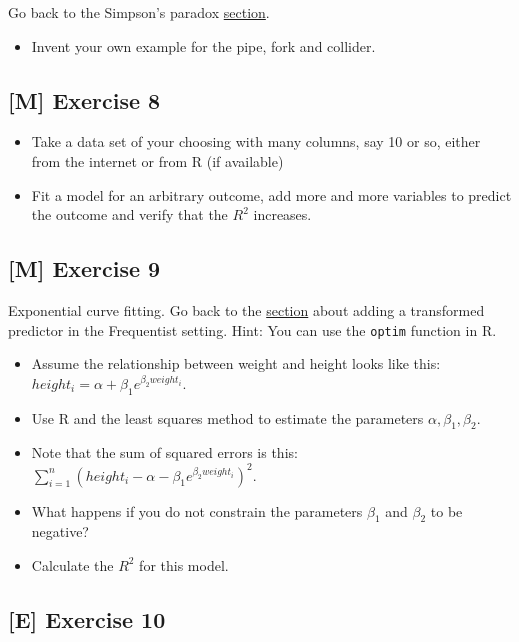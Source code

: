 \documentclass[
]{book}
\providecommand{\tightlist}{%
  \setlength{\itemsep}{0pt}\setlength{\parskip}{0pt}}
\begin{document}
Go back to the Simpson's paradox \hyperref[simpsons_paradox]{section}.

\begin{itemize}
\tightlist
\item
  Invent your own example for the pipe, fork and collider.
\end{itemize}

\subsection{{[}M{]} Exercise 8}\label{exercise8_multiple_regression}

\begin{itemize}
\tightlist
\item
  Take a data set of your choosing with many columns, say 10 or so, either from the internet
  or from R (if available)
\item
  Fit a model for an arbitrary outcome, add more and more variables to predict the outcome
  and verify that the \(R^2\) increases.
\end{itemize}

\subsection{{[}M{]} Exercise 9}\label{exercise9_multiple_regression}

Exponential curve fitting. Go back to the \hyperref[adding_transformed_predictor_freq]{section} about adding a transformed predictor in the Frequentist
setting. Hint: You can use the \texttt{optim} function in R.

\begin{itemize}
\tightlist
\item
  Assume the relationship between weight and height looks like this:
  \(height_i = \alpha + \beta_1 e^{\beta_2 weight_i}\).
\item
  Use R and the least squares method to estimate the parameters \(\alpha, \beta_1, \beta_2\).
\item
  Note that the sum of squared errors is this:
  \(\sum_{i=1}^n (height_i - \alpha - \beta_1 e^{\beta_2 weight_i})^2\).
\item
  What happens if you do not constrain the parameters \(\beta_1\) and \(\beta_2\) to be negative?
\item
  Calculate the \(R^2\) for this model.
\end{itemize}

\subsection{{[}E{]} Exercise 10}\label{exercise10_multiple_regression}
\end{document}
